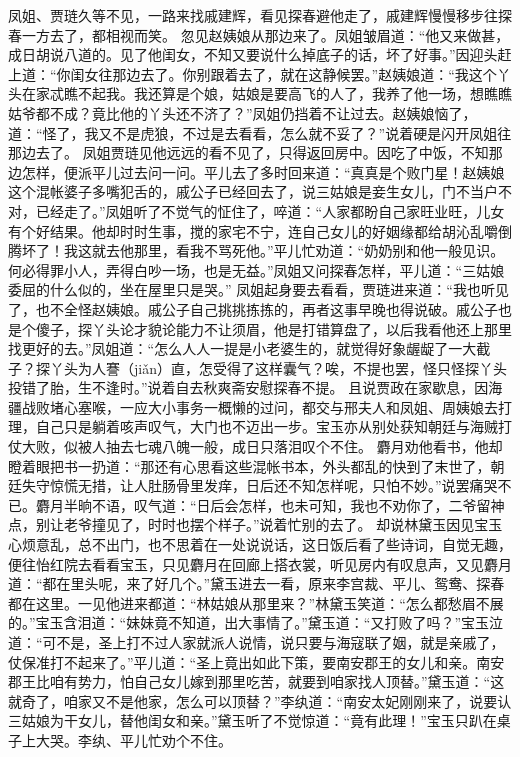 \documentclass[12pt,oneside]{book}
\begin{document}
凤姐、贾琏久等不见，一路来找戚建辉，看见探春避他走了，戚建辉慢慢移步往探春一方去了，都相视而笑。
忽见赵姨娘从那边来了。凤姐皱眉道：“他又来做甚，成日胡说八道的。见了他闺女，不知又要说什么掉底子的话，坏了好事。”因迎头赶上道：“你闺女往那边去了。你别跟着去了，就在这静候罢。”赵姨娘道：“我这个丫头在家忒瞧不起我。我还算是个娘，姑娘是要高飞的人了，我养了他一场，想瞧瞧姑爷都不成？竟比他的丫头还不济了？”凤姐仍挡着不让过去。赵姨娘恼了，道：“怪了，我又不是虎狼，不过是去看看，怎么就不妥了？”说着硬是闪开凤姐往那边去了。
凤姐贾琏见他远远的看不见了，只得返回房中。因吃了中饭，不知那边怎样，便派平儿过去问一问。平儿去了多时回来道：“真真是个败门星！赵姨娘这个混帐婆子多嘴犯舌的，戚公子已经回去了，说三姑娘是妾生女儿，门不当户不对，已经走了。”凤姐听了不觉气的怔住了，啐道：“人家都盼自己家旺业旺，儿女有个好结果。他却时时生事，搅的家宅不宁，连自己女儿的好姻缘都给胡沁乱嚼倒腾坏了！我这就去他那里，看我不骂死他。”平儿忙劝道：“奶奶别和他一般见识。何必得罪小人，弄得白吵一场，也是无益。”凤姐又问探春怎样，平儿道：“三姑娘委屈的什么似的，坐在屋里只是哭。”
凤姐起身要去看看，贾琏进来道：“我也听见了，也不全怪赵姨娘。戚公子自己挑挑拣拣的，再者这事早晚也得说破。戚公子也是个傻子，探丫头论才貌论能力不让须眉，他是打错算盘了，以后我看他还上那里找更好的去。”凤姐道：“怎么人人一提是小老婆生的，就觉得好象龌龊了一大截子？探丫头为人謇（jiǎn）直，怎受得了这样囊气？唉，不提也罢，怪只怪探丫头投错了胎，生不逢时。”说着自去秋爽斋安慰探春不提。
且说贾政在家歇息，因海疆战败堵心塞喉，一应大小事务一概懒的过问，都交与邢夫人和凤姐、周姨娘去打理，自己只是躺着咳声叹气，大门也不迈出一步。宝玉亦从别处获知朝廷与海贼打仗大败，似被人抽去七魂八魄一般，成日只落泪叹个不住。
麝月劝他看书，他却瞪着眼把书一扔道：“那还有心思看这些混帐书本，外头都乱的快到了末世了，朝廷失守惊慌无措，让人肚肠骨里发痒，日后还不知怎样呢，只怕不妙。”说罢痛哭不已。麝月半晌不语，叹气道：“日后会怎样，也未可知，我也不劝你了，二爷留神点，别让老爷撞见了，时时也摆个样子。”说着忙别的去了。
却说林黛玉因见宝玉心烦意乱，总不出门，也不思着在一处说说话，这日饭后看了些诗词，自觉无趣，便往怡红院去看看宝玉，只见麝月在回廊上搭衣裳，听见房内有叹息声，又见麝月道：“都在里头呢，来了好几个。”黛玉进去一看，原来李宫裁、平儿、鸳鸯、探春都在这里。一见他进来都道：“林姑娘从那里来？”林黛玉笑道：“怎么都愁眉不展的。”宝玉含泪道：“妹妹竟不知道，出大事情了。”黛玉道：“又打败了吗？”宝玉泣道：“可不是，圣上打不过人家就派人说情，说只要与海寇联了姻，就是亲戚了，仗保准打不起来了。”平儿道：“圣上竟出如此下策，要南安郡王的女儿和亲。南安郡王比咱有势力，怕自己女儿嫁到那里吃苦，就要到咱家找人顶替。”黛玉道：“这就奇了，咱家又不是他家，怎么可以顶替？”李纨道：“南安太妃刚刚来了，说要认三姑娘为干女儿，替他闺女和亲。”黛玉听了不觉惊道：“竟有此理！”宝玉只趴在桌子上大哭。李纨、平儿忙劝个不住。
\end{document}
